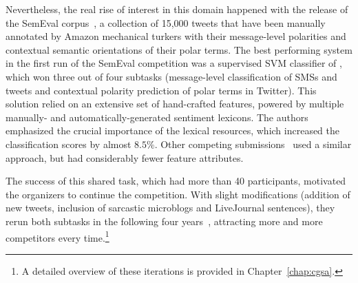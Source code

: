 
Nevertheless, the real rise of interest in this domain happened with
the release of the Sem\-Eval corpus~\cite{Nakov:13}, a collection of
15,000 tweets that have been manually annotated by Amazon mechanical
turkers with their message-level polarities and contextual semantic
orientations of their polar terms. The best performing system in the
first run of the SemEval competition was a supervised SVM classifier
of \citet{Mohammad:13}, which won three out of four subtasks
(message-level classification of SMSs and tweets and contextual
polarity prediction of polar terms in Twitter).  This solution relied
on an extensive set of hand-crafted features, powered by multiple
manually- and automatically-generated sentiment lexicons.  The authors
emphasized the crucial importance of the lexical resources, which
increased the classification scores by almost $8.5\%$.  Other
competing submissions~\cite{Becker:13,Guenther:13,Kokciyan:13} used a
similar approach, but had considerably fewer feature attributes.

The success of this shared task, which had more than 40 participants,
motivated the organizers to continue the competition.  With slight
modifications (addition of new tweets, inclusion of sarcastic
microblogs and LiveJournal sentences), they rerun both subtasks in the
following four
years~\cite{Rosenthal:14,Rosenthal:15,Nakov:16,Rosenthal:17},
attracting more and more competitors every time.\footnote{A detailed
  overview of these iterations is provided in
  Chapter~\ref{chap:cgsa}.}



